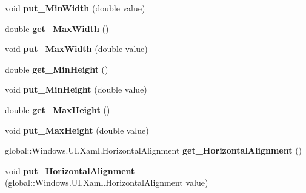 \begin{DoxyCompactItemize}
void {\bfseries put\+\_\+\+Min\+Width} (double value)
\item 
\mbox{\label{interface_windows_1_1_u_i_1_1_xaml_1_1_i_framework_element_aa6ac637854d925baf831328d2fbe5710}} 
double {\bfseries get\+\_\+\+Max\+Width} ()
\item 
\mbox{\label{interface_windows_1_1_u_i_1_1_xaml_1_1_i_framework_element_a5977c40c364f95f274b1bc6ad1513499}} 
void {\bfseries put\+\_\+\+Max\+Width} (double value)
\item 
\mbox{\label{interface_windows_1_1_u_i_1_1_xaml_1_1_i_framework_element_a5eb796332425e5720055d42398ac4a38}} 
double {\bfseries get\+\_\+\+Min\+Height} ()
\item 
\mbox{\label{interface_windows_1_1_u_i_1_1_xaml_1_1_i_framework_element_a40a39aa19edb81ecda1099fb601ca3b4}} 
void {\bfseries put\+\_\+\+Min\+Height} (double value)
\item 
\mbox{\label{interface_windows_1_1_u_i_1_1_xaml_1_1_i_framework_element_a7fd2781c3f760e605441d9dda430e90d}} 
double {\bfseries get\+\_\+\+Max\+Height} ()
\item 
\mbox{\label{interface_windows_1_1_u_i_1_1_xaml_1_1_i_framework_element_aea77c6cfc78af44390a3dfc2768ab96b}} 
void {\bfseries put\+\_\+\+Max\+Height} (double value)
\item 
\mbox{\label{interface_windows_1_1_u_i_1_1_xaml_1_1_i_framework_element_a60effb1f7f1912daafa8558633745836}} 
global\+::\+Windows.\+U\+I.\+Xaml.\+Horizontal\+Alignment {\bfseries get\+\_\+\+Horizontal\+Alignment} ()
\item 
\mbox{\label{interface_windows_1_1_u_i_1_1_xaml_1_1_i_framework_element_a94803d051b65803464005eaca8d55c70}} 
void {\bfseries put\+\_\+\+Horizontal\+Alignment} (global\+::\+Windows.\+U\+I.\+Xaml.\+Horizontal\+Alignment value)

\end{DoxyCompactItemize}
